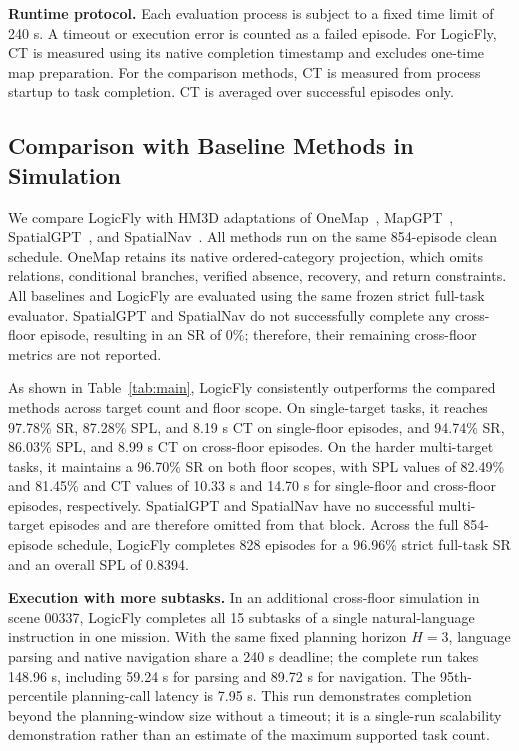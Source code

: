 \documentclass[letterpaper,10pt,journal]{IEEEtran}
\begin{document}
\textbf{Runtime protocol.}
Each evaluation process is subject to a fixed time limit of 240 s. A timeout or execution error is counted as a failed episode. For LogicFly, CT is measured using its native completion timestamp and excludes one-time map preparation. For the comparison methods, CT is measured from process startup to task completion. CT is averaged over successful episodes only.

\subsection{Comparison with Baseline Methods in Simulation}
We compare LogicFly with HM3D adaptations of OneMap~\cite{busch2025onemap}, MapGPT~\cite{chen2024mapgpt}, SpatialGPT~\cite{jiang2025spatialgpt}, and SpatialNav~\cite{zhang2026spatialnav}. All methods run on the same 854-episode clean schedule. OneMap retains its native ordered-category projection, which omits relations, conditional branches, verified absence, recovery, and return constraints. All baselines and LogicFly are evaluated using the same frozen strict full-task evaluator. SpatialGPT and SpatialNav do not successfully complete any cross-floor episode, resulting in an SR of 0\%; therefore, their remaining cross-floor metrics are not reported.

As shown in Table~\ref{tab:main}, LogicFly consistently outperforms the compared methods across target count and floor scope. On single-target tasks, it reaches 97.78\% SR, 87.28\% SPL, and 8.19 s CT on single-floor episodes, and 94.74\% SR, 86.03\% SPL, and 8.99 s CT on cross-floor episodes. On the harder multi-target tasks, it maintains a 96.70\% SR on both floor scopes, with SPL values of 82.49\% and 81.45\% and CT values of 10.33 s and 14.70 s for single-floor and cross-floor episodes, respectively. SpatialGPT and SpatialNav have no successful multi-target episodes and are therefore omitted from that block. Across the full 854-episode schedule, LogicFly completes 828 episodes for a 96.96\% strict full-task SR and an overall SPL of 0.8394.

\textbf{Execution with more subtasks.}
In an additional cross-floor simulation in scene 00337, LogicFly completes all 15 subtasks of a single natural-language instruction in one mission. With the same fixed planning horizon $H=3$, language parsing and native navigation share a 240 s deadline; the complete run takes 148.96 s, including 59.24 s for parsing and 89.72 s for navigation. The 95th-percentile planning-call latency is 7.95 s. This run demonstrates completion beyond the planning-window size without a timeout; it is a single-run scalability demonstration rather than an estimate of the maximum supported task count.
\end{document}
